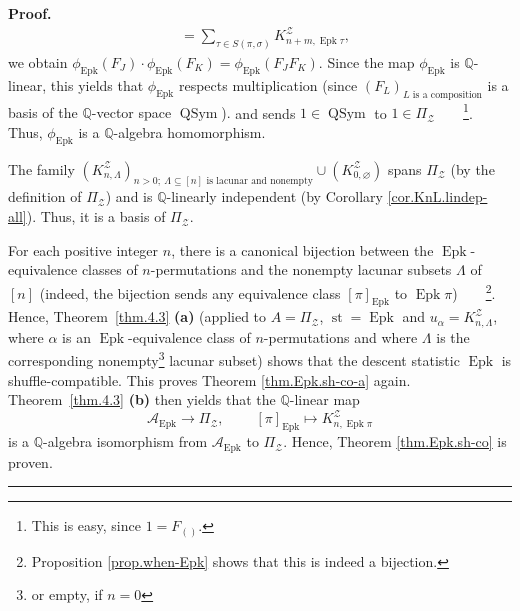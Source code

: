 \documentclass[numbers=enddot,12pt,final,onecolumn,notitlepage]{scrartcl}%
\theoremstyle{definition}
\newenvironment{proof}[1][Proof]{\noindent\textbf{#1.} }{\ \rule{0.5em}{0.5em}}
\newenvironment{verlong}{}{}
\let\sumnonlimits\sum
\renewcommand{\sum}{\sumnonlimits\limits}
\begin{document}
\begin{verlong}
\begin{proof}
{\begin{align*}
&  =\sum_{\tau\in S\left(  \pi,\sigma\right)  }K_{n+m,\operatorname*{Epk}\tau
}^{\mathcal{Z}},
\end{align*}
we obtain $\phi_{\operatorname*{Epk}}\left(  F_{J}\right)  \cdot
\phi_{\operatorname*{Epk}}\left(  F_{K}\right)  =\phi_{\operatorname*{Epk}%
}\left(  F_{J}F_{K}\right)  $. Since the map $\phi_{\operatorname*{Epk}}$ is
$\mathbb{Q}$-linear, this yields that $\phi_{\operatorname*{Epk}}$ respects
multiplication (since $\left(  F_{L}\right)  _{L\text{ is a composition}}$ is
a basis of the $\mathbb{Q}$-vector space $\operatorname*{QSym}$).} and sends
$1\in\operatorname*{QSym}$ to $1\in\Pi_{\mathcal{Z}}$\ \ \ \ \footnote{This is
easy, since $1=F_{\left(  {}\right)  }$.}. Thus, $\phi_{\operatorname*{Epk}}$
is a $\mathbb{Q}$-algebra homomorphism.

The family $\left(  K_{n,\Lambda}^{\mathcal{Z}}\right)  _{n>0;\ \Lambda
\subseteq\left[  n\right]  \text{ is lacunar and nonempty}}\cup\left(
K_{0,\varnothing}^{\mathcal{Z}}\right)  $ spans $\Pi_{\mathcal{Z}}$ (by the
definition of $\Pi_{\mathcal{Z}}$) and is $\mathbb{Q}$-linearly independent
(by Corollary \ref{cor.KnL.lindep-all}). Thus, it is a basis of $\Pi
_{\mathcal{Z}}$.

For each positive integer $n$, there is a canonical bijection between the
$\operatorname*{Epk}$-equivalence classes of $n$-permutations and the nonempty
lacunar subsets $\Lambda$ of $\left[  n\right]  $ (indeed, the bijection sends
any equivalence class $\left[  \pi\right]  _{\operatorname*{Epk}}$ to
$\operatorname*{Epk}\pi$)\ \ \ \ \footnote{Proposition \ref{prop.when-Epk}
shows that this is indeed a bijection.}. Hence, Theorem~\ref{thm.4.3}
\textbf{(a)} (applied to $A=\Pi_{\mathcal{Z}}$, $\operatorname*{st}%
=\operatorname*{Epk}$ and $u_{\alpha}=K_{n,\Lambda}^{\mathcal{Z}}$, where
$\alpha$ is an $\operatorname*{Epk}$-equivalence class of $n$-permutations and
where $\Lambda$ is the corresponding nonempty\footnote{or empty, if $n=0$}
lacunar subset) shows that the descent statistic $\operatorname*{Epk}$ is
shuffle-compatible. This proves Theorem \ref{thm.Epk.sh-co-a} again.
Theorem~\ref{thm.4.3} \textbf{(b)} then yields that the $\mathbb{Q}$-linear
map%
\[
\mathcal{A}_{\operatorname*{Epk}}\rightarrow\Pi_{\mathcal{Z}}%
,\ \ \ \ \ \ \ \ \ \ \left[  \pi\right]  _{\operatorname*{Epk}}\mapsto
K_{n,\operatorname*{Epk}\pi}^{\mathcal{Z}}%
\]
is a $\mathbb{Q}$-algebra isomorphism from $\mathcal{A}_{\operatorname*{Epk}}$
to $\Pi_{\mathcal{Z}}$. Hence, Theorem \ref{thm.Epk.sh-co} is proven.
\end{proof}
\end{verlong}
\end{document}

